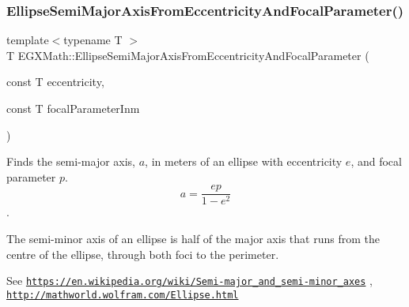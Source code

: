 \mbox{\label{group___e_g_x_math-_geometry-2_d-_ellipse-_semi_major_axis_ga77845ca288672da90567f533679e7024}} 
\subsubsection{\texorpdfstring{Ellipse\+Semi\+Major\+Axis\+From\+Eccentricity\+And\+Focal\+Parameter()}{EllipseSemiMajorAxisFromEccentricityAndFocalParameter()}}
{\footnotesize\ttfamily template$<$typename T $>$ \\
T E\+G\+X\+Math\+::\+Ellipse\+Semi\+Major\+Axis\+From\+Eccentricity\+And\+Focal\+Parameter (\begin{DoxyParamCaption}\item[{const T}]{eccentricity,  }\item[{const T}]{focal\+Parameter\+Inm }\end{DoxyParamCaption})}



Finds the semi-\/major axis, $a$, in meters of an ellipse with eccentricity $e$, and focal parameter $p$. \[ a=\dfrac{ep}{1-e^2} \]. 

The semi-\/minor axis of an ellipse is half of the major axis that runs from the centre of the ellipse, through both foci to the perimeter.

See \href{https://en.wikipedia.org/wiki/Semi-major_and_semi-minor_axes}{\tt https\+://en.\+wikipedia.\+org/wiki/\+Semi-\/major\+\_\+and\+\_\+semi-\/minor\+\_\+axes} , \href{http://mathworld.wolfram.com/Ellipse.html}{\tt http\+://mathworld.\+wolfram.\+com/\+Ellipse.\+html}


